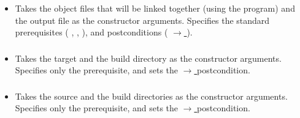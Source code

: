 \subsubsection*{}\label{subsec:Link}

\begin{itemize}[label={}]
    \item Takes the object files that will be linked together (using the  program) and the output file as the
          constructor arguments.
          Specifies the standard prerequisites (
          \hyperref[subsec:ProgramExistsPrerequisite]{},
          \hyperref[subsec:FileExistsPrerequisite]{},
          \hyperref[subsec:NonEmptyListPrerequisite]{}
          ), and postconditions (
          \hyperref[subsec:ExitCodePostcondition]{ $\rightarrow$ }
          ).
\end{itemize}

\subsubsection*{}\label{subsec:Make}

\begin{itemize}[label={}]
    \item Takes the target and the build directory as the constructor arguments.
          Specifies only the \hyperref[subsec:ProgramExistsPrerequisite]{}
          prerequisite, and sets the
          \hyperref[subsec:ExitCodePostcondition]{ $\rightarrow$ }
          postcondition.
\end{itemize}

\subsubsection*{}\label{subsec:CMake}

\begin{itemize}[label={}]
    \item Takes the source and the build directories as the constructor arguments.
          Specifies only the \hyperref[subsec:ProgramExistsPrerequisite]{}
          prerequisite, and sets the
          \hyperref[subsec:ExitCodePostcondition]{ $\rightarrow$ }
          postcondition.
\end{itemize}

